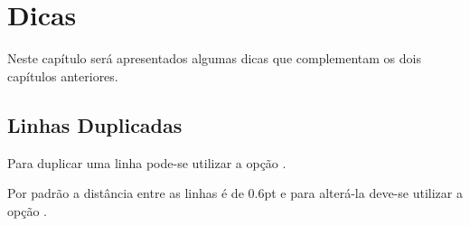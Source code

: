 % 
% 
% 
% 
% 
\chapter{Dicas}
Neste cap\'{i}tulo ser\'{a} apresentados algumas dicas que complementam os dois cap\'{i}tulos anteriores.

\section{Linhas Duplicadas}
Para duplicar uma linha pode-se utilizar a op\c{c}\~{a}o .


Por padr\~{a}o a dist\^{a}ncia entre as linhas \'{e} de 0.6pt e para alter\'{a}-la deve-se utilizar a op\c{c}\~{a}o .

